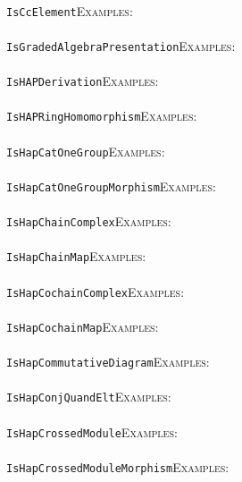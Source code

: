 \documentclass[a4paper,11pt]{report}
\begin{document}
{{ \\
 \texttt{IsCcElement}{\nobreakspace}{\nobreakspace}{\nobreakspace}{\nobreakspace}\textsc{Examples:} \\
 \\
 \texttt{IsGradedAlgebraPresentation}{\nobreakspace}{\nobreakspace}{\nobreakspace}{\nobreakspace}\textsc{Examples:} \\
 \\
 \texttt{IsHAPDerivation}{\nobreakspace}{\nobreakspace}{\nobreakspace}{\nobreakspace}\textsc{Examples:} \\
 \\
 \texttt{IsHAPRingHomomorphism}{\nobreakspace}{\nobreakspace}{\nobreakspace}{\nobreakspace}\textsc{Examples:} \\
 \\
 \texttt{IsHapCatOneGroup}{\nobreakspace}{\nobreakspace}{\nobreakspace}{\nobreakspace}\textsc{Examples:} \\
 \\
 \texttt{IsHapCatOneGroupMorphism}{\nobreakspace}{\nobreakspace}{\nobreakspace}{\nobreakspace}\textsc{Examples:} \\
 \\
 \texttt{IsHapChainComplex}{\nobreakspace}{\nobreakspace}{\nobreakspace}{\nobreakspace}\textsc{Examples:} \\
 \\
 \texttt{IsHapChainMap}{\nobreakspace}{\nobreakspace}{\nobreakspace}{\nobreakspace}\textsc{Examples:} \\
 \\
 \texttt{IsHapCochainComplex}{\nobreakspace}{\nobreakspace}{\nobreakspace}{\nobreakspace}\textsc{Examples:} \\
 \\
 \texttt{IsHapCochainMap}{\nobreakspace}{\nobreakspace}{\nobreakspace}{\nobreakspace}\textsc{Examples:} \\
 \\
 \texttt{IsHapCommutativeDiagram}{\nobreakspace}{\nobreakspace}{\nobreakspace}{\nobreakspace}\textsc{Examples:} \\
 \\
 \texttt{IsHapConjQuandElt}{\nobreakspace}{\nobreakspace}{\nobreakspace}{\nobreakspace}\textsc{Examples:} \\
 \\
 \texttt{IsHapCrossedModule}{\nobreakspace}{\nobreakspace}{\nobreakspace}{\nobreakspace}\textsc{Examples:} \\
 \\
 \texttt{IsHapCrossedModuleMorphism}{\nobreakspace}{\nobreakspace}{\nobreakspace}{\nobreakspace}\textsc{Examples:} \\
}}
\end{document}
